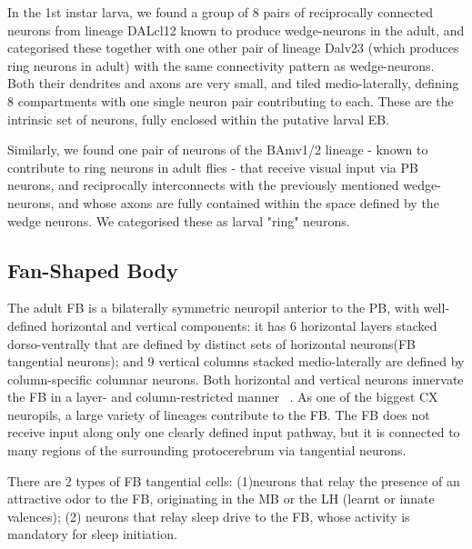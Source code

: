 In the 1st instar larva, we found a group of 8 pairs of reciprocally connected neurons from lineage DALcl12 known to produce wedge-neurons in the adult, and categorised these together with one other pair of lineage Dalv23 (which produces ring neurons in adult) with the same connectivity pattern as wedge-neurons. Both their dendrites and axons are very small, and tiled medio-laterally, defining 8 compartments with one single neuron pair contributing to each. These are the intrinsic set of neurons, fully enclosed within the putative larval EB. 

Similarly, we found one pair of neurons of the BAmv1/2 lineage - known to contribute to ring neurons in adult flies - that receive visual input via PB neurons, and reciprocally interconnects with the previously mentioned wedge-neurons, and whose axons are fully contained within the space defined by the wedge neurons. We categorised these as larval "ring" neurons.




\subsection*{Fan-Shaped Body}


The adult FB is a bilaterally symmetric neuropil anterior to the PB, with well-defined horizontal and vertical components: it has 6 horizontal layers stacked dorso-ventrally that are defined by distinct sets of horizontal neurons(FB tangential neurons); and 9 vertical columns stacked medio-laterally are defined by column-specific columnar neurons. Both horizontal and vertical neurons innervate the FB in a layer- and column-restricted manner ~\citep{heinze2017unraveling}. As one of the biggest CX neuropils, a large variety of lineages contribute to the FB.
The FB does not receive input along only one clearly defined input pathway, but it is connected to many regions of the surrounding protocerebrum via tangential neurons. 

There are 2 types of FB tangential cells: (1)neurons that relay the presence of an attractive odor to the FB, originating in the MB or the LH (learnt or innate valences); (2) neurons that relay sleep drive to the FB, whose activity is mandatory for sleep initiation. 

